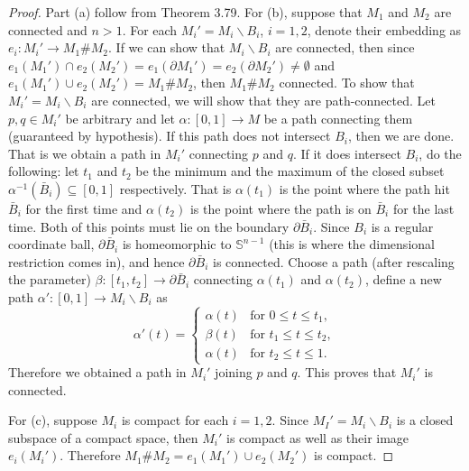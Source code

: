 \documentclass[a4paper]{article}
\theoremstyle{remark}
\newcommand{\doo}{\partial}    %
\newcommand{\subhim}{\subseteq} %
\begin{document}
\begin{proof}
	Part (a) follow from Theorem 3.79. For (b), suppose that $M_1$ and $M_2$ are connected and $n>1$. For each $M_i'=M_i\smallsetminus B_i$, $i=1,2$, denote their embedding as $e_i : M_i' \to M_1 \# M_2 $. If we can show that $M_i \smallsetminus B_i$ are connected, then since $e_1(M_1') \cap e_2(M_2') =e_1(\doo M_1') = e_2(\doo M_2') \neq \emptyset$ and $e_1(M_1') \cup e_2(M_2')  = M_1\# M_2$, then $M_1 \# M_2$ connected. To show that $M_i' = M_i \smallsetminus B_i$ are connected, we will show that they are path-connected. Let $p,q \in M_i'$ be arbitrary and let $\alpha : [0,1] \to M$ be a path connecting them (guaranteed by hypothesis). If this path does not intersect $B_i$, then we are done. That is we obtain a path in $M_i'$  connecting $p$ and $q$. If it does intersect $B_i$, do the following: let $t_1$ and $t_2$ be the minimum and the maximum of the closed subset $\alpha^{-1}(\bar{B}_i) \subhim [0,1]$ respectively. That is $\alpha(t_1)$ is the point where the path  hit $\bar{B}_i$ for the first time and $\alpha(t_2)$ is the point where the path is on $\bar{B}_i$ for the last time. Both of this points must lie on the boundary $\doo \bar{B}_i$. Since $B_i$ is a regular coordinate ball, $\doo \bar{B}_i$ is homeomorphic to $\mathbb{S}^{n-1}$ (this is where the dimensional restriction comes in), and hence $\doo \bar{B}_i$ is connected. Choose a path (after rescaling the parameter) $\beta : [t_1,t_2] \to \doo \bar{B}_i$ connecting $\alpha(t_1)$ and $\alpha(t_2)$, define a new path $\alpha' : [0,1] \to M_i\smallsetminus B_i$ as
	\begin{equation*}
	\alpha'(t) =  \left\{
	\begin{array}{rl}
	\alpha(t) & \text{for } 0 \leq t \leq t_1,\\
	\beta(t) & \text{for } t_1 \leq t \leq t_2,\\
	\alpha(t) & \text{for } t_2 \leq t \leq 1.
	\end{array} \right.
	\end{equation*}
	Therefore we obtained a path in $M_i'$ joining $p$ and $q$. This proves that $M_i'$ is connected.
	
	For (c), suppose $M_i$ is compact for each $i=1,2$. Since $M_I'=M_i\smallsetminus B_i$ is a closed subspace of a compact space, then $M_i'$ is compact as well as their image $e_i(M_i')$. Therefore $M_1 \# M_2 = e_1(M_1') \cup e_2(M_2')$ is compact.
\end{proof}
\end{document}
